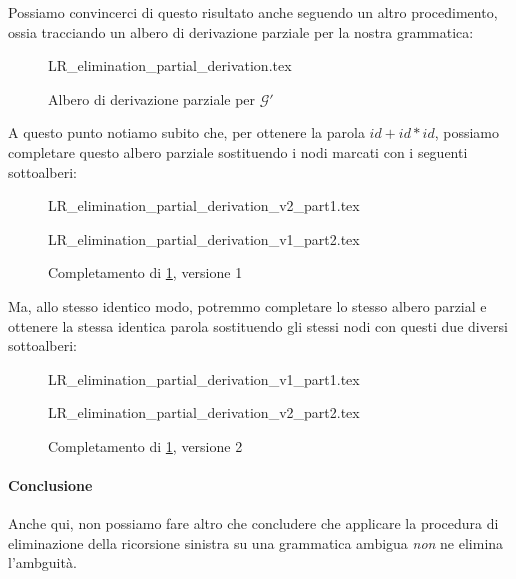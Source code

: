 \documentclass[class=book, crop=false, oneside, 12pt]{standalone}
\begin{document}
Possiamo convincerci di questo risultato anche seguendo un altro procedimento, ossia tracciando un albero di derivazione parziale per la nostra grammatica:
\begin{figure}[H]
    \centering
    {LR_elimination_partial_derivation.tex}
    \caption{Albero di derivazione parziale per \(\mathcal{G'}\)}
    \label{fxness-lrremove- ambiguity_1}
\end{figure}
A questo punto notiamo subito che, per ottenere la parola \(id + id * id\), possiamo completare questo albero parziale sostituendo i nodi marcati con i seguenti sottoalberi:
\begin{figure}[H]
    \begin{minipage}[b]{0.4\textwidth}
        \centering
        {LR_elimination_partial_derivation_v2_part1.tex}
        \subcaption{}
        \label{fxness-lrremove- ambiguity_2_1}
    \end{minipage}
    \hfill
    \begin{minipage}[b]{0.4\textwidth}
        \centering
        {LR_elimination_partial_derivation_v1_part2.tex}
        \subcaption{}
        \label{fxness-lrremove- ambiguity_2_2}
    \end{minipage}
    \caption{Completamento di \ref{fxness-lrremove- ambiguity_1}, versione 1}
    \label{fxness-lrremove- ambiguity_2}
\end{figure}
Ma, allo stesso identico modo, potremmo completare lo stesso albero parzial e ottenere la stessa identica parola sostituendo gli stessi nodi con questi due diversi sottoalberi:
\begin{figure}[H]
    \begin{minipage}[b]{0.4\textwidth}
        \centering
        {LR_elimination_partial_derivation_v1_part1.tex}
        \subcaption{}
        \label{fxness-lrremove- ambiguity_3_1}
    \end{minipage}
    \hfill
    \begin{minipage}[b]{0.4\textwidth}
        \centering
        {LR_elimination_partial_derivation_v2_part2.tex}
        \subcaption{}
        \label{fxness-lrremove- ambiguity_3_2}
    \end{minipage}
    \caption{Completamento di \ref{fxness-lrremove- ambiguity_1}, versione 2}
    \label{fxness-lrremove- ambiguity_3}
\end{figure}

\paragraph{Conclusione}
Anche qui, non possiamo fare altro che concludere che applicare la procedura di eliminazione della ricorsione sinistra su una grammatica ambigua \emph{non} ne elimina l'ambguità.
\end{document}
